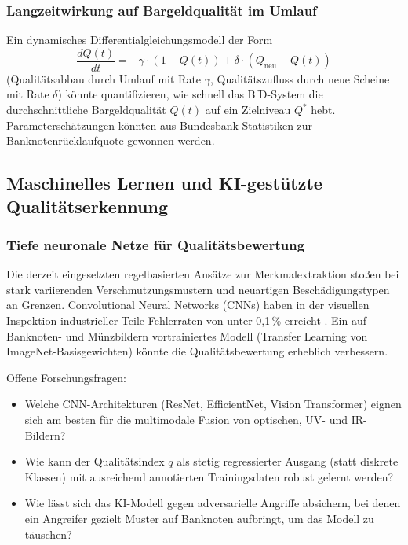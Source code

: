 ﻿\documentclass[a4paper,12pt]{article}
\theoremstyle{definition}
\begin{document}
\subsubsection{Langzeitwirkung auf Bargeldqualität im Umlauf}

Ein dynamisches Differentialgleichungsmodell der Form
\[
\frac{dQ(t)}{dt} = -\gamma \cdot (1 - Q(t)) + \delta \cdot (Q_{\text{neu}} - Q(t))
\]
(Qualitätsabbau durch Umlauf mit Rate $\gamma$, Qualitätszufluss durch neue
Scheine mit Rate $\delta$) könnte quantifizieren, wie schnell das BfD-System
die durchschnittliche Bargeldqualität $Q(t)$ auf ein Zielniveau $Q^*$ hebt.
Parameterschätzungen könnten aus Bundesbank-Statistiken zur Banknotenrücklaufquote
gewonnen werden.

\subsection{Maschinelles Lernen und KI-gestützte Qualitätserkennung}

\subsubsection{Tiefe neuronale Netze für Qualitätsbewertung}

Die derzeit eingesetzten regelbasierten Ansätze zur Merkmalextraktion
stoßen bei stark variierenden Verschmutzungsmustern und neuartigen
Beschädigungstypen an Grenzen.  Convolutional Neural Networks (CNNs)
haben in der visuellen Inspektion industrieller Teile Fehlerraten
von unter 0{,}1\,\% erreicht \cite{lecun2015}.
Ein auf Banknoten- und Münzbildern vortrainiertes Modell (Transfer Learning
von ImageNet-Basisgewichten) könnte die Qualitätsbewertung erheblich verbessern.

Offene Forschungsfragen:
\begin{itemize}
  \item Welche CNN-Architekturen (ResNet, EfficientNet, Vision Transformer)
        eignen sich am besten für die multimodale Fusion von optischen,
        UV- und IR-Bildern?
  \item Wie kann der Qualitätsindex $q$ als stetig regressierter Ausgang
        (statt diskrete Klassen) mit ausreichend annotierten Trainingsdaten
        robust gelernt werden?
  \item Wie lässt sich das KI-Modell gegen adversarielle Angriffe absichern,
        bei denen ein Angreifer gezielt Muster auf Banknoten aufbringt,
        um das Modell zu täuschen?
\end{itemize}
\end{document}
